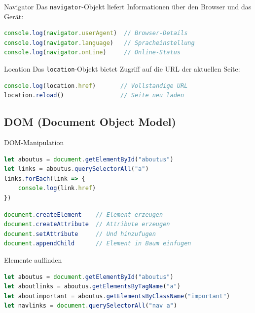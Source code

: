 \begin{definition}{Navigator}
Das \texttt{navigator}-Objekt liefert Informationen über den Browser und das Gerät:
\begin{lstlisting}[language=JavaScript, style=basesmol]
console.log(navigator.userAgent)  // Browser-Details
console.log(navigator.language)   // Spracheinstellung
console.log(navigator.onLine)     // Online-Status
\end{lstlisting}
\end{definition}

\begin{definition}{Location}
Das \texttt{location}-Objekt bietet Zugriff auf die URL der aktuellen Seite:
\begin{lstlisting}[language=JavaScript, style=basesmol]
console.log(location.href)       // Vollstandige URL
location.reload()                // Seite neu laden
\end{lstlisting}
\end{definition}

\subsection{DOM (Document Object Model)}

\begin{code}{DOM-Manipulation}
\begin{lstlisting}[language=JavaScript, style=basesmol]
let aboutus = document.getElementById("aboutus")
let links = aboutus.querySelectorAll("a")
links.forEach(link => {
    console.log(link.href)
})
\end{lstlisting}

\begin{lstlisting}[language=JavaScript, style=basesmol]
document.createElement    // Element erzeugen
document.createAttribute  // Attribute erzeugen
document.setAttribute     // Und hinzufugen
document.appendChild      // Element in Baum einfugen
\end{lstlisting}
\end{code}

\begin{examplecode}{Elemente auffinden}
\begin{lstlisting}[language=JavaScript, style=basesmol]
let aboutus = document.getElementById("aboutus")
let aboutlinks = aboutus.getElementsByTagName("a")
let aboutimportant = aboutus.getElementsByClassName("important")
let navlinks = document.querySelectorAll("nav a")
\end{lstlisting}
\end{examplecode}
  
